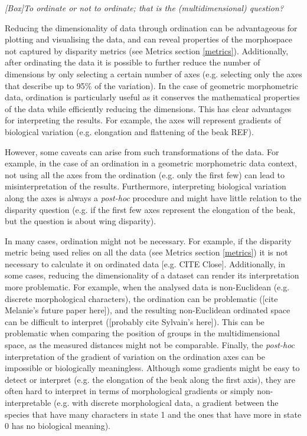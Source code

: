 \documentclass[12pt,letterpaper]{article}
\renewcommand{\subsection}[1]{%
\bigskip
\begin{center}
\begin{large}
\normalfont\itshape #1
\end{large}
\end{center}}
\begin{document}
\subsection{[Box]To ordinate or not to ordinate; that is the (multidimensional) question?}
\label{box_ordination}
Reducing the dimensionality of data through ordination can be advantageous for plotting and visualising the data, and can reveal properties of the morphospace not captured by disparity metrics (see Metrics section \ref{metrics}).
Additionally, after ordinating the data it is possible to further reduce the number of dimensions by only selecting a certain number of axes (e.g. selecting only the axes that describe up to 95\% of the variation).
In the case of geometric morphometric data, ordination is particularly useful as it conserves the mathematical properties of the data while efficiently reducing the dimensions.
This has clear advantages for interpreting the results.
For example, the axes will represent gradients of biological variation (e.g. elongation and flattening of the beak REF).

However, some caveats can arise from such transformations of the data.
For example, in the case of an ordination in a geometric morphometric data context, not using all the axes from the ordination (e.g. only the first few) can lead to misinterpretation of the results.
Furthermore, interpreting biological variation along the axes is always a \textit{post-hoc} procedure and might have little relation to the disparity question (e.g. if the first few axes represent the elongation of the beak, but the question is about wing disparity).

In many cases, ordination might not be necessary.
For example, if the disparity metric being used relies on all the data (see Metrics section \ref{metrics}) it is not necessary to calculate it on ordinated data [e.g. CITE Close].
Additionally, in some cases, reducing the dimensionality of a dataset can render its interpretation more problematic.
For example, when the analysed data is non-Euclidean (e.g. discrete morphological characters), the ordination can be problematic ([cite Melanie's future paper here]), and the resulting non-Euclidean ordinated space can be difficult to interpret ([probably cite Sylvain's here]).
This can be problematic when comparing the position of groups in the multidimensional space, as the measured distances might not be comparable.
Finally, the \textit{post-hoc} interpretation of the gradient of variation on the ordination axes can be impossible or biologically meaningless.
Although some gradients might be easy to detect or interpret (e.g. the elongation of the beak along the first axis), they are often hard to interpret in terms of morphological gradients or simply non-interpretable (e.g. with discrete morphological data, a gradient between the species that have many characters in state 1 and the ones that have more in state 0 has no biological meaning).
\end{document}
